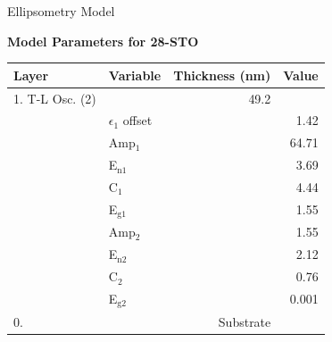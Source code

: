 \documentclass[professionalfont]{beamer}
\begin{document}
\begin{frame}{Ellipsometry Model}
	\begin{center}
	\vspace*{-1em}
	{\bfseries\large Model Parameters for 28-STO}\\[1em]
	\begin{tabular}{l l r r}
	\toprule
	Layer&Variable&Thickness (nm)&Value\\
	\midrule
	1. T-L Osc. (2)&&49.2&\\
	&$\epsilon_{1}$ offset&&1.42\\
	&Amp$_{1}$&&64.71\\
	&E$_{\mathrm{n 1}}$&&3.69\\
	&C$_{1}$&&4.44\\
	&E$_{\mathrm{g1}}$&&1.55\\
	&Amp$_{2}$&&1.55\\
	&E$_{\mathrm{n 2}}$&&2.12\\
	&C$_{2}$&&0.76\\
	&E$_{\mathrm{g2}}$&&0.001\\
	0. \ce{STO}&&Substrate&\\
	\bottomrule
	\end{tabular}
	\end{center}
\end{frame}

\begin{frame}
\end{frame}

\begin{frame}
\end{frame}
\end{document}
